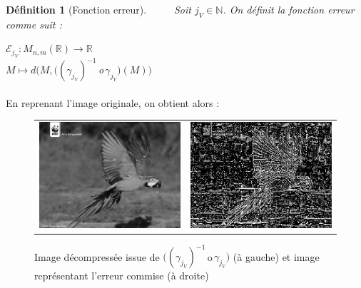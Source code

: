 \documentclass[a4paper,10pt]{report}
\theoremstyle{break}
\newtheorem{Def}{D\'{e}finition}
\begin{document}
\newpage

    \begin{Def}[Fonction erreur]
      $\phantom{Prop}$ Soit $j_V \in \mathbb{N}$. On d\'{e}finit la fonction erreur comme suit :
      \begin{center}
	$\mathcal{E}_{j_V} : M_{n,m}(\mathbb{R}) \longrightarrow \mathbb{R}  $ \\
	$M \longmapsto d \Bigg(M, \Big((\gamma_{j_V})^{-1} \, $o$ \, \gamma_{j_V}\Big)(M) \Bigg)$
      \end{center}

    \end{Def}
    
    \paragraph{} En reprenant l'image originale, on obtient alors :

      \begin{figure}[!h]

	\begin{tabular}{cc}
	
	  \includegraphics[width = 0.5 \linewidth]{decomp_ara.eps} &
	  \includegraphics[width = 0.5 \linewidth]{error_ara.eps} \\	
	  
	\end{tabular}
	
	\caption{Image d\'{e}compress\'{e}e issue de $\Big((\gamma_{j_V})^{-1} \, $o$ \, \gamma_{j_V}\Big)$ (\`{a} gauche) et
	    image repr\'{e}sentant l'erreur commise (\`{a} droite)}
	
      \end{figure}  
      
\end{document}
